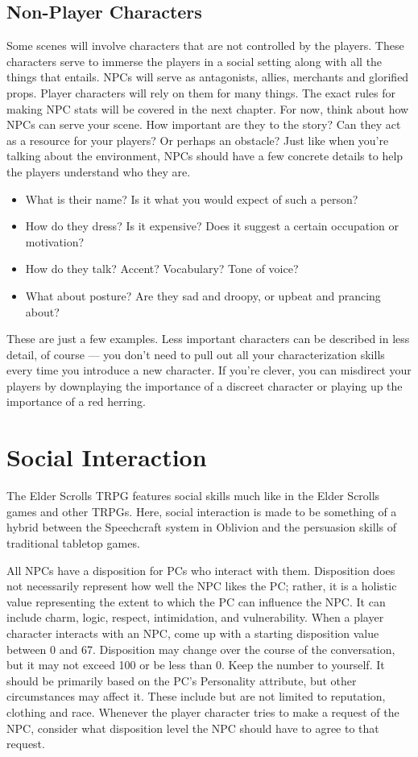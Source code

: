 \documentclass[12pt]{book}
\begin{document}
\subsection{Non-Player Characters}
Some scenes will involve characters that are not controlled by the players. These characters serve to immerse the players in a social setting along with all the things that entails. NPCs will serve as antagonists, allies, merchants and glorified props. Player characters will rely on them for many things. The exact rules for making NPC stats will be covered in the next chapter. For now, think about how NPCs can serve your scene. How important are they to the story? Can they act as a resource for your players? Or perhaps an obstacle? Just like when you're talking about the environment, NPCs should have a few concrete details to help the players understand who they are.

\begin{itemize}
	\item What is their name? Is it what you would expect of such a person?
	\item How do they dress? Is it expensive? Does it suggest a certain occupation or motivation?
	\item How do they talk? Accent? Vocabulary? Tone of voice?
	\item What about posture? Are they sad and droopy, or upbeat and prancing about?
\end{itemize}

These are just a few examples. Less important characters can be described in less detail, of course --- you don't need to pull out all your characterization skills every time you introduce a new character. If you're clever, you can misdirect your players by downplaying the importance of a discreet character or playing up the importance of a red herring.

\section{Social Interaction}
The Elder Scrolls TRPG features social skills much like in the Elder Scrolls games and other TRPGs. Here, social interaction is made to be something of a hybrid between the Speechcraft system in Oblivion and the persuasion skills of traditional tabletop games.

All NPCs have a disposition for PCs who interact with them. Disposition does not necessarily represent how well the NPC likes the PC; rather, it is a holistic value representing the extent to which the PC can influence the NPC. It can include charm, logic, respect, intimidation, and vulnerability. When a player character interacts with an NPC, come up with a starting disposition value between 0 and 67. Disposition may change over the course of the conversation, but it may not exceed 100 or be less than 0. Keep the number to yourself. It should be primarily based on the PC's Personality attribute, but other circumstances may affect it. These include but are not limited to reputation, clothing and race. Whenever the player character tries to make a request of the NPC, consider what disposition level the NPC should have to agree to that request.
\end{document}
